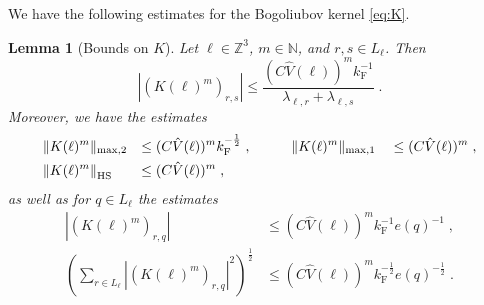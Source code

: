 \documentclass[12pt,a4paper]{article}
\numberwithin{equation}{section}
\newcommand{\1}{\mathbb{I}}
\newcommand{\F}{\mathrm{F}}
\newcommand{\HS}{\mathrm{HS}}
\newcommand{\Zstar}{\mathbb{Z}^3} %
\newcommand{\Z}{\mathbb{Z}}
\newcommand{\half}{\frac{1}{2}}
\theoremstyle{plain}
\newtheorem{lemma}[theorem]{Lemma}
\theoremstyle{definition}
\theoremstyle{remark}
\theoremstyle{plain}
\theoremstyle{definition}
\theoremstyle{remark}
\begin{document}
We have the following estimates for the Bogoliubov kernel \cref{eq:K}.
\begin{lemma}[Bounds on $ K $]\label{lem:normsk}
Let $ \ell \in \Zstar $, $ m \in \mathbb{N} $, and $ r,s \in L_\ell $. Then
\begin{equation} \label{eq:K_element_bounds}
	|(K(\ell)^m)_{r,s}|
	\le \frac{(C \hat{V}(\ell))^m k_{\F}^{-1}}{\lambda_{\ell,r} + \lambda_{\ell,s}} \;.
\end{equation}
Moreover, we have the estimates
\begin{equation} \label{eq:K_max_bounds}
\begin{aligned}
	&\Vert K(\ell)^m \Vert_{\max,2}
	&\le \; &(C \hat{V}(\ell))^m k_{\F}^{-\half} \;, \qquad
	&&\Vert K(\ell)^m \Vert_{\max,1}
	&&\le (C \hat{V}(\ell))^m \;, \\
	&\norm{K(\ell)^m}_{\HS}
	&\le \; &(C \hat{V}(\ell))^m \;,
\end{aligned} 
\end{equation}
as well as for $ q \in L_\ell $ the estimates
\begin{equation} \label{eq:e(q)_extraction_bounds}
\begin{split}
	|(K(\ell)^m)_{r,q}|
	& \le (C \hat{V}(\ell))^m k_{\F}^{-1} e(q)^{-1} \;, \\
	\left( \sum_{r \in L_\ell} |(K(\ell)^m)_{r,q}|^2 \right)^{\half}
	& \le (C \hat{V}(\ell))^m k_{\F}^{-\half} e(q)^{-\half} \;.
\end{split}
\end{equation}
\end{lemma}
\end{document}
